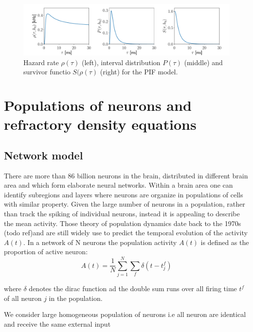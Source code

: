 \documentclass[a4paper,11pt,twoside]{article}
\numberwithin{equation}{section}
\begin{document}
\begin{figure}[h!]
	
	\includegraphics[width=\linewidth]{inversegaussian.pdf}
	\caption{Hazard rate $\rho(\tau)$ (left), interval distribution $P(\tau)$ (middle) and survivor functio $S(\rho(\tau)$ (right) for the PIF model.
	}
	\label{fig:inversegaussianprocess}
\end{figure}



\section{Populations of neurons and refractory density equations}

\subsection{Network model}

There are more than 86 billion neurons in the brain, distributed in different brain area and which form elaborate neural networks. Within a brain area one can identify subregions and layers where neurons are organize in populations of cells with similar property. Given the large number of neurons in a population, rather than track the spiking of individual neurons, instead it is appealing to describe the mean activity. 
Those theory of population dynamics date back to the 1970s (todo ref)and are still widely use to predict the temporal evolution of the activity $A(t)$. In a network of N neurons the population activity $A(t)$ is defined as the proportion of active neuron:
\begin{equation}
A(t)=\frac{1}{N}\sum_{j=1}^N\sum_f\delta(t-t_j^f)
\end{equation}

where $\delta$ denotes the dirac function ad the double sum runs over all firing time $t^f$ of all neuron $j$ in the population.

We consider large homogeneous population of neurons i.e all neuron are identical and receive the same external input


 
\end{document}
